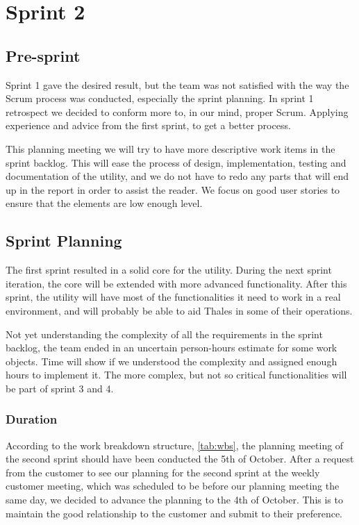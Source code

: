 \chapter{Sprint 2}

\section{Pre-sprint}
Sprint 1 gave the desired result, but the team was not satisfied with the way the Scrum process was conducted, especially the sprint planning. In sprint 1 retrospect we decided to conform more to, in our mind, proper Scrum. Applying experience and advice from the first sprint, to get a better process. 

This planning meeting we will try to have more descriptive work items in the sprint backlog. This will ease the process of design, implementation, testing and documentation of the utility, and we do not have to redo any parts that will end up in the report in order to assist the reader. We focus on good user stories to ensure that the elements are low enough level.


\section{Sprint Planning}
The first sprint resulted in a solid core for the utility. During the next sprint iteration, the core will be extended with more advanced functionality. After this sprint, the utility will have most of the functionalities it need to work in a real environment, and will probably be able to aid Thales in some of their operations.

Not yet understanding the complexity of all the requirements in the sprint backlog, the team ended in an uncertain person-hours estimate for some work objects. Time will show if we understood the complexity and assigned enough hours to implement it. The more complex, but not so critical functionalities will be part of sprint 3 and 4.   

\subsection{Duration}
According to the work breakdown structure, \autoref{tab:wbs}, the planning meeting of the second sprint should have been conducted the 5th of October. After a request from the customer to see our planning for the second sprint at the weekly customer meeting, which was scheduled to be before our planning meeting the same day, we decided to advance the planning to the 4th of October. This is to maintain the good relationship to the customer and submit to their preference.

